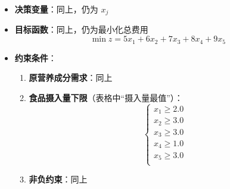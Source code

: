 \begin{enumerate}
    \begin{itemize}
        \item \textbf{决策变量}：同上，仍为 $ x_j $
        \item \textbf{目标函数}：同上，仍为最小化总费用
        $$
        \min z = 5x_1 + 6x_2 + 7x_3 + 8x_4 + 9x_5
        $$
        \item \textbf{约束条件}：
        \begin{enumerate}
            \item \textbf{原营养成分需求}：同上
            \item \textbf{食品摄入量下限}（表格中“摄入量最值”）：
            $$
            \begin{cases}
            x_1 \geq 2.0 \\
            x_2 \geq 3.0 \\
            x_3 \geq 3.0 \\
            x_4 \geq 1.0 \\
            x_5 \geq 3.0 \\
            \end{cases}
            $$
            \item \textbf{非负约束}：同上
        \end{enumerate}
    \end{itemize}
\end{enumerate}
